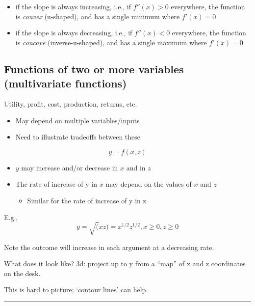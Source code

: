 \documentclass[]{article}
\providecommand{\tightlist}{%
  \setlength{\itemsep}{0pt}\setlength{\parskip}{0pt}}
\begin{document}
\begin{itemize}
\tightlist
\item
  if the slope is always increasing, i.e., if \(f''(x)>0\) everywhere,
  the function is \emph{convex} (u-shaped), and has a single minimum
  where \(f'(x)=0\)
\item
  if the slope is always decreasing, i.e., if \(f''(x)<0\) everywhere,
  the function is \emph{concave} (inverse-u-shaped), and has a single
  maximum where \(f'(x)=0\)
\end{itemize}

\hypertarget{multivar-functions}{%
\subsection{Functions of two or more variables (multivariate
functions)}\label{multivar-functions}}

Utility, profit, cost, production, returns, etc.

\begin{itemize}
\tightlist
\item
  May depend on multiple variables/inputs
\item
  Need to illustrate tradeoffs between these
\end{itemize}

\[y=f(x,z)\]

\begin{itemize}
\item
  \(y\) may increase and/or decrease in \(x\) and in \(z\)
\item
  The rate of increase of y in \(x\) may depend on the values of \(x\)
  and \(z\)

  \begin{itemize}
  \tightlist
  \item
    Similar for the rate of increase of y in z
  \end{itemize}
\end{itemize}

\bigskip

E.g., \[y=\sqrt(xz) = x^{1/2}z^{1/2}, x \geq 0, z \geq 0\]

Note the outcome will increase in each argument at a decreasing rate.

What does it look like? 3d: project up to y from a ``map'' of x and z
coordinates on the desk.

This is hard to picture; `contour lines' can help.

\begin{center}\rule{0.5\linewidth}{\linethickness}\end{center}
\end{document}
